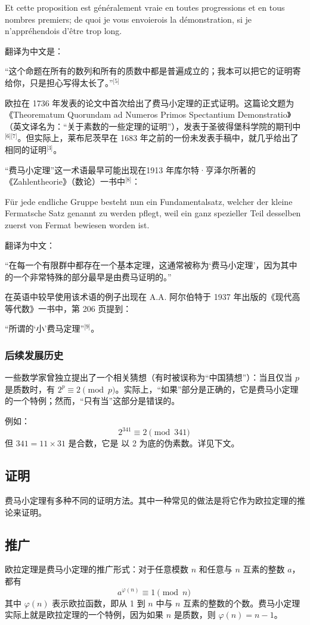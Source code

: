 Et cette proposition est généralement vraie en toutes progressions et en tous nombres premiers; de quoi je vous envoierois la démonstration, si je n'appréhendois d'être trop long.

翻译为中文是：

“这个命题在所有的数列和所有的质数中都是普遍成立的；我本可以把它的证明寄给你，只是担心写得太长了。”\(^\text{[5]}\)

欧拉在 1736 年发表的论文中首次给出了费马小定理的正式证明。这篇论文题为 《Theorematum Quorundam ad Numeros Primos Spectantium Demonstratio》（英文译名为：“关于素数的一些定理的证明”），发表于圣彼得堡科学院的期刊中\(^\text{[6][7]}\)。但实际上，莱布尼茨早在 1683 年之前的一份未发表手稿中，就几乎给出了相同的证明\(^\text{[3]}\)。

“费马小定理”这一术语最早可能出现在1913 年库尔特·亨泽尔所著的《Zahlentheorie》（数论）一书中\(^\text{[8]}\)：

Für jede endliche Gruppe besteht nun ein Fundamentalsatz, welcher der kleine Fermatsche Satz genannt zu werden pflegt, weil ein ganz spezieller Teil desselben zuerst von Fermat bewiesen worden ist.

翻译为中文：

“在每一个有限群中都存在一个基本定理，这通常被称为‘费马小定理’，因为其中的一个非常特殊的部分最早是由费马证明的。”

在英语中较早使用该术语的例子出现在 A.A. 阿尔伯特于 1937 年出版的《现代高等代数》一书中，第 206 页提到：

“所谓的‘小’费马定理”\(^\text{[9]}\)。
\subsubsection{后续发展历史}
一些数学家曾独立提出了一个相关猜想（有时被误称为“中国猜想”）：当且仅当 $p$ 是质数时，有 $2^p \equiv 2 \pmod{p}$。实际上，“如果”部分是正确的，它是费马小定理的一个特例；然而，“只有当”这部分是错误的。

例如：
$$
2^{341} \equiv 2 \pmod{341}~
$$
但 $341 = 11 \times 31$ 是合数，它是 以 2 为底的伪素数。详见下文。
\subsection{证明}
费马小定理有多种不同的证明方法。其中一种常见的做法是将它作为欧拉定理的推论来证明。
\subsection{推广}
欧拉定理是费马小定理的推广形式：对于任意模数 $n$ 和任意与 $n$ 互素的整数 $a$，都有
$$
a^{\varphi(n)} \equiv 1 \pmod{n}~
$$
其中 $\varphi(n)$ 表示欧拉函数，即从 1 到 $n$ 中与 $n$ 互素的整数的个数。费马小定理实际上就是欧拉定理的一个特例，因为如果 $n$ 是质数，则 $\varphi(n) = n - 1$。


